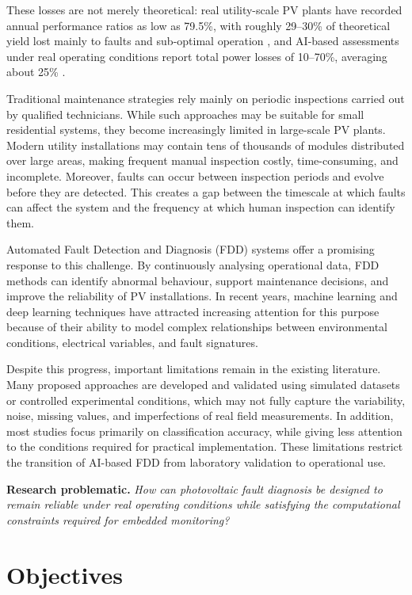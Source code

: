 These losses are not merely theoretical: real utility-scale PV plants have recorded annual performance ratios as low as 79.5\%, with roughly 29--30\% of theoretical yield lost mainly to faults and sub-optimal operation \citep{alhmoud2023why}, and AI-based assessments under real operating conditions report total power losses of 10--70\%, averaging about 25\% \citep{salazarpena2024ai}.

Traditional maintenance strategies rely mainly on periodic inspections carried out by qualified technicians. While such approaches may be suitable for small residential systems, they become increasingly limited in large-scale PV plants. Modern utility installations may contain tens of thousands of modules distributed over large areas, making frequent manual inspection costly, time-consuming, and incomplete. Moreover, faults can occur between inspection periods and evolve before they are detected. This creates a gap between the timescale at which faults can affect the system and the frequency at which human inspection can identify them.

Automated Fault Detection and Diagnosis (FDD) systems offer a promising response to this challenge. By continuously analysing operational data, FDD methods can identify abnormal behaviour, support maintenance decisions, and improve the reliability of PV installations. In recent years, machine learning and deep learning techniques have attracted increasing attention for this purpose because of their ability to model complex relationships between environmental conditions, electrical variables, and fault signatures.

Despite this progress, important limitations remain in the existing literature. Many proposed approaches are developed and validated using simulated datasets or controlled experimental conditions, which may not fully capture the variability, noise, missing values, and imperfections of real field measurements. In addition, most studies focus primarily on classification accuracy, while giving less attention to the conditions required for practical implementation. These limitations restrict the transition of AI-based FDD from laboratory validation to operational use.

\noindent\textbf{Research problematic.}
\emph{How can photovoltaic fault diagnosis be designed to remain reliable under real operating conditions while satisfying the computational constraints required for embedded monitoring?}

\section*{Objectives}

